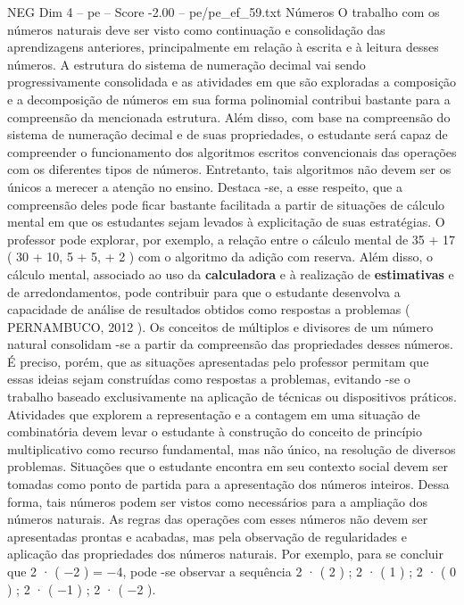 \begin{textsample}{NEG Dim 4 – pe – Score -2.00 – pe/pe\_ef\_59.txt}  \label{ex:f4_neg_012}
Números O trabalho com os números naturais deve ser visto como continuação e consolidação das aprendizagens anteriores, principalmente em relação à escrita e à leitura desses números.
A estrutura do sistema de numeração decimal vai sendo progressivamente consolidada e as atividades em que são exploradas a composição e a decomposição de números em sua forma polinomial contribui bastante para a compreensão da mencionada estrutura.
Além disso, com base na compreensão do sistema de numeração decimal e de suas propriedades, o estudante será capaz de compreender o funcionamento dos algoritmos escritos convencionais das operações com os diferentes tipos de números.
Entretanto, tais algoritmos não devem ser os únicos a merecer a atenção no ensino.
Destaca -se, a esse respeito, que a compreensão deles pode ficar bastante facilitada a partir de situações de cálculo mental em que os estudantes sejam levados à explicitação de suas estratégias.
O professor pode explorar, por exemplo, a relação entre o cálculo mental de 35 + 17 ( 30 + 10, 5 + 5, + 2 ) com o algoritmo da adição com reserva.
Além disso, o cálculo mental, associado ao uso da \textbf{calculadora} e à realização de \textbf{estimativas} e de arredondamentos, pode contribuir para que o estudante desenvolva a capacidade de análise de resultados obtidos como respostas a problemas ( PERNAMBUCO, 2012 ).
Os conceitos de múltiplos e divisores de um número natural consolidam -se a partir da compreensão das propriedades desses números.
É preciso, porém, que as situações apresentadas pelo professor permitam que essas ideias sejam construídas como respostas a problemas, evitando -se o trabalho baseado exclusivamente na aplicação de técnicas ou dispositivos práticos.
Atividades que explorem a representação e a contagem em uma situação de combinatória devem levar o estudante à construção do conceito de princípio multiplicativo como recurso fundamental, mas não único, na resolução de diversos problemas.
Situações que o estudante encontra em seu contexto social devem ser tomadas como ponto de partida para a apresentação dos números inteiros.
Dessa forma, tais números podem ser vistos como necessários para a ampliação dos números naturais.
As regras das operações com esses números não devem ser apresentadas prontas e acabadas, mas pela observação de regularidades e aplicação das propriedades dos números naturais.
Por exemplo, para se concluir que 2 · ( −2 ) = −4, pode -se observar a sequência 2 · ( 2 ) ; 2 · ( 1 ) ; 2 · ( 0 ) ; 2 · ( −1 ) ; 2 · ( −2 ).

\end{textsample}
